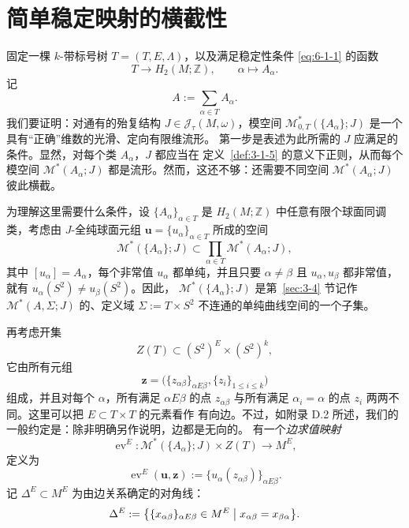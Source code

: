 
\section{简单稳定映射的横截性}\label{sec:6-2}

固定一棵 $k$-带标号树 $T=(T,E,\Lambda)$，以及满足稳定性条件
\eqref{eq:6-1-1} 的函数
\[
  T\longrightarrow H_2(M;\mathbb Z),
  \qquad \alpha\longmapsto A_\alpha.
\]
记
\[
  A:=\sum_{\alpha\in T}A_\alpha.
\]
我们要证明：对通有的殆复结构 $J\in\mathcal J_\tau(M,\omega)$，模空间
$\mathcal M^*_{0,T}(\{A_\alpha\};J)$ 是一个具有“正确”维数的光滑、定向有限维流形。
第一步是表述为此所需的 $J$ 应满足的条件。显然，对每个类 $A_\alpha$，$J$ 都应当在
定义~\ref{def:3-1-5} 的意义下正则，从而每个模空间
$\mathcal M^*(A_\alpha;J)$ 都是流形。然而，这还不够：还需要不同空间
$\mathcal M^*(A_\alpha;J)$ 彼此横截。

为理解这里需要什么条件，设 $\{A_\alpha\}_{\alpha\in T}$ 是
$H_2(M;\mathbb Z)$ 中任意有限个球面同调类，考虑由 $J$-全纯球面元组
$\mathbf u=\{u_\alpha\}_{\alpha\in T}$ 所成的空间
\[
  \mathcal M^*(\{A_\alpha\};J)
  \subset\prod_{\alpha\in T}\mathcal M^*(A_\alpha;J),
\]
其中 $[u_\alpha]=A_\alpha$，每个非常值 $u_\alpha$ 都单纯，并且只要
$\alpha\ne\beta$ 且 $u_\alpha,u_\beta$ 都非常值，就有
$u_\alpha(S^2)\ne u_\beta(S^2)$。因此，
$\mathcal M^*(\{A_\alpha\};J)$ 是第~\ref{sec:3-4} 节记作
$\mathcal M^*(A,\Sigma;J)$ 的、定义域
$\Sigma:=T\times S^2$ 不连通的单纯曲线空间的一个子集。

再考虑开集
\[
  Z(T)\subset(S^2)^E\times(S^2)^k,
\]
它由所有元组
\[
  \mathbf z=\bigl(\{z_{\alpha\beta}\}_{\alpha E\beta},
  \{z_i\}_{1\le i\le k}\bigr)
\]
组成，并且对每个 $\alpha$，所有满足 $\alpha E\beta$ 的点 $z_{\alpha\beta}$ 与所有满足
$\alpha_i=\alpha$ 的点 $z_i$ 两两不同。这里可以把 $E\subset T\times T$ 的元素看作
有向边。不过，如附录 D.2 所述，我们的一般约定是：除非明确另作说明，边都是无向的。
有一个\emph{边求值映射}
\[
  \operatorname{ev}^E:
  \mathcal M^*(\{A_\alpha\};J)\times Z(T)
  \longrightarrow M^E,
\]
定义为
\begin{equation}\label{eq:6-2-1}
  \operatorname{ev}^E(\mathbf u,\mathbf z)
  :=\{u_\alpha(z_{\alpha\beta})\}_{\alpha E\beta}.
\end{equation}
记 $\Delta^E\subset M^E$ 为由边关系确定的对角线：
\[
  \Delta^E
  :=\bigl\{\{x_{\alpha\beta}\}_{\alpha E\beta}\in M^E
  \bigm|x_{\alpha\beta}=x_{\beta\alpha}\bigr\}.
\]

